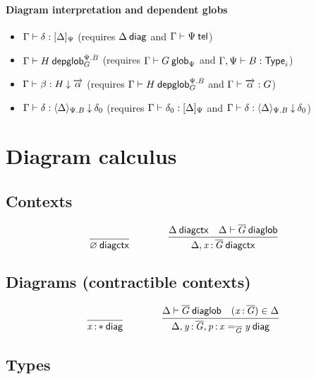 \paragraph{Diagram interpretation and dependent globs}

\begin{itemize}
\item ${\Gamma} \vdash {\delta} : {[ \Delta ]_{\Psi}}$
(requires $\Delta \: \mathsf{diag}$ and ${\Gamma} \vdash {\Psi} \: \mathsf{tel}$)
\item ${\Gamma} \vdash {H} \: \mathsf{depglob}^{\Psi.B}_{G}$
(requires ${\Gamma} \vdash {G} \: \mathsf{glob}_{\Psi}$ and ${\Gamma,\Psi} \vdash {B} : {\mathsf{Type}_{i}}$)
\item ${\Gamma} \vdash {\beta} : {H}\mathbin{\downarrow}{\overrightarrow{\alpha}}$
(requires ${\Gamma} \vdash {H} \: \mathsf{depglob}^{\Psi.B}_{G}$
and ${\Gamma} \vdash {\ensuremath{\overrightarrow{\alpha}}} : {G}$)
\item ${\Gamma} \vdash {\delta} : {\langle \Delta \rangle_{\Psi.B}}\mathbin{\downarrow}{\delta_0}$
(requires ${\Gamma} \vdash {\delta_0} : {[ \Delta ]_{\Psi}}$
and ${\Gamma} \vdash {\delta} : {\langle \Delta \rangle_{\Psi.B}}\mathbin{\downarrow}{\delta_0}$)
\end{itemize}

\section{Diagram calculus}

\subsection{Contexts}

\begin{small}
  \[
  \infer{\wfdiagctx{\emptyctx}}{}
  \qquad\qquad
  \infer
  {\wfdiagctx{\Delta,\tptm{x}{\diag G}}}
  {\wfdiagctx{\Delta} & \wfdiaglob{\Delta}{\diag G}}\]
\end{small}

\subsection{Diagrams (contractible contexts)}


\begin{small}
  \[
  \infer{\wfdiag{\tptm{x}{\diagbase}}}{}
  \qquad\qquad
  \infer{\wfdiag{\Delta,\tptm{y}{\diag G},\tptm{p}{\homj{\diag{G}}{x}{y}}}}
  {\wfdiaglob{\Delta}{\diag G}
    & (\tptm{x}{\diag{G}}) \in \Delta}\]
\end{small}

\subsection{Types}

